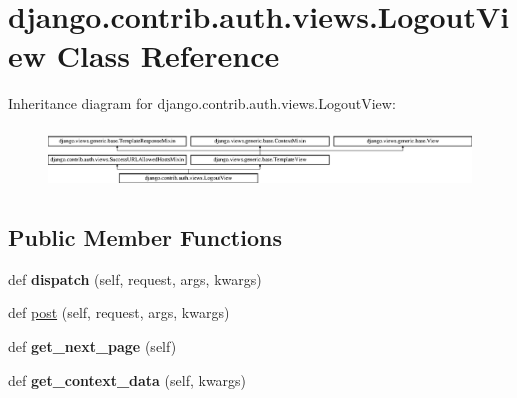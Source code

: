\hypertarget{classdjango_1_1contrib_1_1auth_1_1views_1_1_logout_view}{}\section{django.\+contrib.\+auth.\+views.\+Logout\+View Class Reference}
\label{classdjango_1_1contrib_1_1auth_1_1views_1_1_logout_view}
Inheritance diagram for django.\+contrib.\+auth.\+views.\+Logout\+View\+:\begin{figure}[H]
\begin{center}
\leavevmode
\includegraphics[height=1.618497cm]{classdjango_1_1contrib_1_1auth_1_1views_1_1_logout_view}
\end{center}
\end{figure}
\subsection*{Public Member Functions}
\begin{DoxyCompactItemize}
\item 
\mbox{\label{classdjango_1_1contrib_1_1auth_1_1views_1_1_logout_view_a7e34dbac765576c3fab1136c0d6ef351}} 
def {\bfseries dispatch} (self, request, args, kwargs)
\item 
def \mbox{\hyperlink{classdjango_1_1contrib_1_1auth_1_1views_1_1_logout_view_a5b764772cc3b0056ace2d6132624e107}{post}} (self, request, args, kwargs)
\item 
\mbox{\label{classdjango_1_1contrib_1_1auth_1_1views_1_1_logout_view_ac4d64e5e8912871e5235d47ea0c1aac9}} 
def {\bfseries get\+\_\+next\+\_\+page} (self)
\item 
\mbox{\label{classdjango_1_1contrib_1_1auth_1_1views_1_1_logout_view_a4e8fe2b606a58ff97ef2a8c6344dd5ce}} 
def {\bfseries get\+\_\+context\+\_\+data} (self, kwargs)
\end{DoxyCompactItemize}

